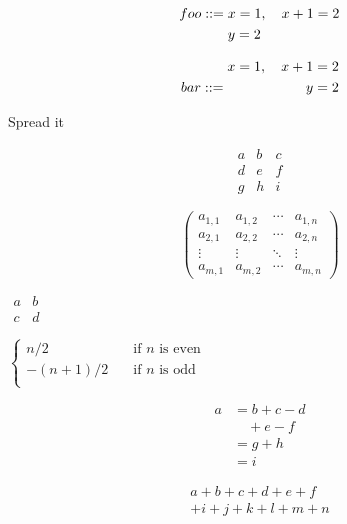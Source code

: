 \documentclass{article}
\newcommand{\horz}{\noindent\makebox[\linewidth]{\rule{\paperwidth}{0.4pt}}}
\begin{document}
\horz

\begin{equation}
foo::=\begin{lgathered}[t]
x=1,\quad x+1=2 \\
y=2
\end{lgathered}
\end{equation}

\begin{equation}
bar::=\begin{rgathered}[b]
x=1,\quad x+1=2 \\
y=2
\end{rgathered}
\end{equation}

\horz

Spread it
\begin{spreadlines}{30pt}
  \[
  \begin{matrix}
   a & b & c \\
   d & e & f \\
   g & h & i
  \end{matrix}
  \]
  
  \[
  \begin{pmatrix}
   a_{1,1} & a_{1,2} & \cdots & a_{1,n} \\
   a_{2,1} & a_{2,2} & \cdots & a_{2,n} \\
   \vdots  & \vdots  & \ddots & \vdots  \\
   a_{m,1} & a_{m,2} & \cdots & a_{m,n} 
  \end{pmatrix}
  \]
  
  $\begin{smallmatrix} a&b \\ c&d \end{smallmatrix}$
  
  $\begin{cases} n/2 & \quad \text{if } n \text{ is even}\\ -(n+1)/2 & \quad \text{if } n \text{ is odd}\\ \end{cases}$
  
  \begin{equation}\label{xx}
  \begin{split}
  a& =b+c-d\\
  & \quad +e-f\\
  & =g+h\\
  & =i
  \end{split}
  \end{equation}
  
  \begin{multline}
  a+b+c+d+e+f\\
  +i+j+k+l+m+n
  \end{multline}
  

\end{spreadlines}
\end{document}
